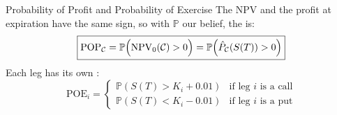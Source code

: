 \documentclass[aspectratio=169,11pt]{beamer}
\newcommand{\Cc}{\mathcal{C}}
\begin{document}
\begin{frame}{Probability of Profit and Probability of Exercise}
  The NPV and the profit at expiration have the same sign, so with $\mathbb{P}$
  our belief, the  is:
  \begin{equation*}
    \boxed{\text{POP}_{\Cc} = \mathbb{P}\Bigl(\operatorname{NPV}_{0}(\Cc)>0\Bigr) = \mathbb{P}\Bigl(\hat{P}_{\Cc}(S(T))>0\Bigr)}
  \end{equation*}
  Each leg has its own :
  \begin{equation*}
    \text{POE}_{i} = \begin{cases}
      \mathbb{P}\left(S(T)>K_{i}+0.01\right) & \text{if leg } i \text{ is a call}\\
      \mathbb{P}\left(S(T)<K_{i}-0.01\right) & \text{if leg } i \text{ is a put}
    \end{cases}
  \end{equation*}
\end{frame}
\end{document}
